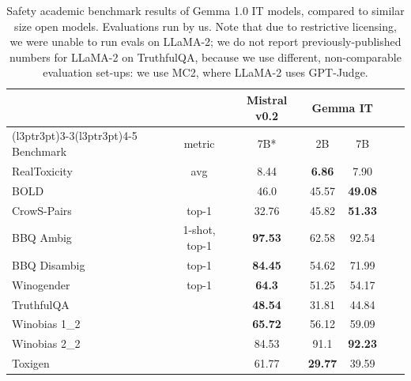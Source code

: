 \documentclass[11pt, a4paper, logo, twocolumn, copyright, nonumbering]{googledeepmind}
\begin{document}
\begin{table}[h!]
    \centering
    \begin{tabular}{l c c c  c c  c }
    \toprule
         & & Mistral v0.2 & \multicolumn{2}{c}{Gemma IT}\\
        \cmidrule(l{3pt}r{3pt}){3-3}\cmidrule(l{3pt}r{3pt}){4-5}
Benchmark & metric  & 7B* & 2B & 7B \\
      \midrule
RealToxicity & avg & 8.44 & \textbf{6.86} & 7.90 \\
BOLD &  & 46.0 & 45.57 & \textbf{49.08}  \\
CrowS-Pairs & top-1 & 32.76 & 45.82 & \textbf{51.33}  \\
BBQ Ambig & 1-shot, top-1 & \textbf{97.53} & 62.58 & 92.54 \\
BBQ Disambig & top-1 & \textbf{84.45} & 54.62 & 71.99 \\
Winogender & top-1 & \textbf{64.3} & 51.25 & 54.17 \\
TruthfulQA & & \textbf{48.54} & 31.81 & 44.84\\
Winobias 1\_2 &  & \textbf{65.72} & 56.12 & 59.09 \\
Winobias 2\_2 &  & 84.53 & 91.1 & \textbf{92.23} \\
Toxigen &  & 61.77 & \textbf{29.77} & 39.59 \\
\bottomrule
\end{tabular}
    \caption{Safety academic benchmark results of Gemma 1.0 IT models, compared to similar size open models. Evaluations run by us. Note that due to restrictive licensing, we were unable to run evals on LLaMA-2; we do not report previously-published numbers for LLaMA-2 on TruthfulQA, because we use different, non-comparable evaluation set-ups: we use MC2, where LLaMA-2 uses GPT-Judge.
    }
    \label{tab:safety_auto_evalsv1}
\end{table}
\end{document}
